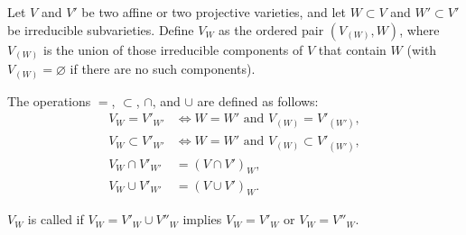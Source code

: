 Let $V$ and $V'$ be two affine or two projective varieties, and let $W \subset V$ and $W' \subset V'$ be irreducible subvarieties. Define $V_W$ as the ordered pair $(V_{(W)}, W)$, where $V_{(W)}$ is the union of those irreducible components of $V$ that contain $W$ (with $V_{(W)} = \varnothing$ if there are no such components).

The operations $=$, $\subset$, $\cap$, and $\cup$ are defined as follows:
\begin{align*}
V_W = V'_{W'} &\iff W = W' \text{ and } V_{(W)} = V'_{(W')}, \\
V_W \subset V'_{W'} &\iff W = W' \text{ and } V_{(W)} \subset V'_{(W')}, \\
V_W \cap V'_{W'} &= (V \cap V')_W, \\
V_W \cup V'_{W'} &= (V \cup V')_W.
\end{align*}

$V_W$ is called  if $V_W = V'_W \cup V''_W$ implies $V_W = V'_W$ or $V_W = V''_W$.
